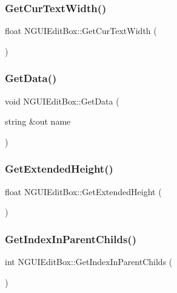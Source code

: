 \subsubsection{\texorpdfstring{Get\+Cur\+Text\+Width()}{GetCurTextWidth()}}
{\footnotesize\ttfamily float N\+G\+U\+I\+Edit\+Box\+::\+Get\+Cur\+Text\+Width (\begin{DoxyParamCaption}{ }\end{DoxyParamCaption})}

\hypertarget{class_n_g_u_i_edit_box_ac657e09763014ba9bf7869ab75d34c55}{}\label{class_n_g_u_i_edit_box_ac657e09763014ba9bf7869ab75d34c55} 
\subsubsection{\texorpdfstring{Get\+Data()}{GetData()}}
{\footnotesize\ttfamily void N\+G\+U\+I\+Edit\+Box\+::\+Get\+Data (\begin{DoxyParamCaption}\item[{string \&out}]{name }\end{DoxyParamCaption})}

\hypertarget{class_n_g_u_i_edit_box_a65a3537ee6dd5bc44c2c45abbf937a70}{}\label{class_n_g_u_i_edit_box_a65a3537ee6dd5bc44c2c45abbf937a70} 
\subsubsection{\texorpdfstring{Get\+Extended\+Height()}{GetExtendedHeight()}}
{\footnotesize\ttfamily float N\+G\+U\+I\+Edit\+Box\+::\+Get\+Extended\+Height (\begin{DoxyParamCaption}{ }\end{DoxyParamCaption})}

\hypertarget{class_n_g_u_i_edit_box_a678fb3a87a38522fdda3c9b1475ed0de}{}\label{class_n_g_u_i_edit_box_a678fb3a87a38522fdda3c9b1475ed0de} 
\subsubsection{\texorpdfstring{Get\+Index\+In\+Parent\+Childs()}{GetIndexInParentChilds()}}
{\footnotesize\ttfamily int N\+G\+U\+I\+Edit\+Box\+::\+Get\+Index\+In\+Parent\+Childs (\begin{DoxyParamCaption}{ }\end{DoxyParamCaption})}

